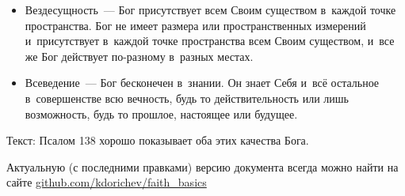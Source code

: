 \documentclass[a4paper,12pt]{article}
\begin{document}
\begin{itemize}
    \item Вездесущность~--- Бог присутствует всем Своим существом в~каждой точке пространства. Бог не имеет размера или пространственных измерений и~присутствует в~каждой точке пространства всем Своим существом, и~все же Бог действует по-разному в~разных местах.

    \item Всеведение~--- Бог бесконечен в~знании. Он знает Себя и~всё остальное в~совершенстве всю вечность, будь то действительность или лишь возможность, будь то прошлое, настоящее или будущее.
\end{itemize}

\noindent Текст: Псалом 138 хорошо показывает оба этих качества Бога. 

\vfill
\tiny{Актуальную (с последними правками) версию документа всегда можно найти на сайте \href{https://github.com/kdorichev/faith_basics/blob/main/God/lesson_3.2.pdf}{github.com/kdorichev/faith\_basics}}
\end{document}
